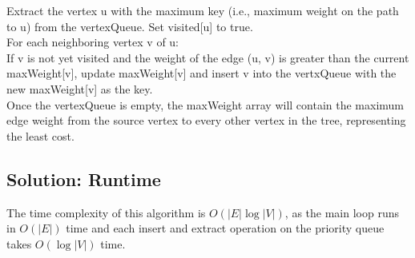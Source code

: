 \documentclass[letter,11pt]{article}
\begin{document}
Extract the vertex u with the maximum key (i.e., maximum weight on the path to u) from the vertexQueue. Set visited[u] to true.\\

For each neighboring vertex v of u:\\

If v is not yet visited and the weight of the edge (u, v) is greater than the current maxWeight[v], update maxWeight[v] and insert v into the vertxQueue with the new maxWeight[v] as the key. \\

Once the vertexQueue is empty, the maxWeight array will contain the maximum edge weight from the source vertex to every other vertex in the tree, representing the least cost. \\

\subsection{Solution: Runtime}

The time complexity of this algorithm is $O(|E| \log |V|)$, as the main loop runs in $O(|E|)$ time and each insert and extract operation on the priority queue takes $O(\log|V|)$ time.
\end{document}
